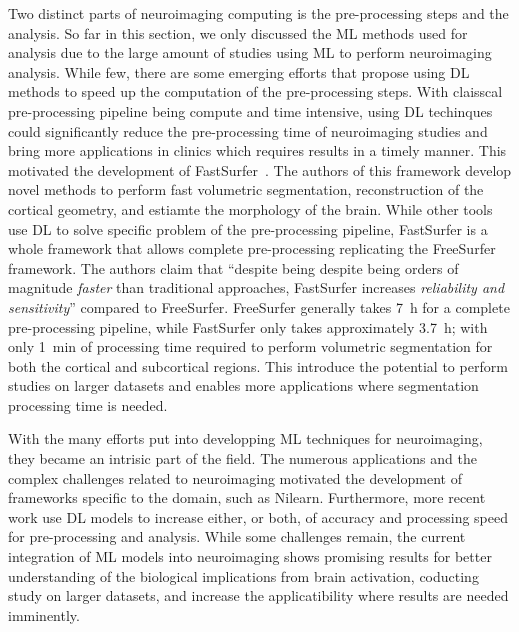 Two distinct parts of neuroimaging computing is the pre-processing steps and the analysis.
So far in this section, we only discussed the ML methods used for analysis due to
the large amount of studies using ML to perform neuroimaging analysis.
While few, there are some emerging efforts that propose using DL methods to speed up
the computation of the pre-processing steps.
With claisscal pre-processing pipeline being compute and time intensive, using 
DL techinques could significantly reduce the pre-processing time of neuroimaging studies
and bring more applications in clinics which requires results in a timely manner.
This motivated the development of FastSurfer~\cite{Henschel2020-vq}.
The authors of this framework develop novel methods to perform fast volumetric segmentation,
reconstruction of the cortical geometry, and estiamte the morphology of the brain.
While other tools use DL to solve specific problem of the pre-processing pipeline,
FastSurfer is a whole framework that allows complete pre-processing replicating the 
FreeSurfer framework.
The authors claim that ``despite being despite being orders of magnitude \textit{faster} than
traditional approaches, FastSurfer increases \textit{reliability and sensitivity}'' compared to FreeSurfer.
FreeSurfer generally takes \SI{7}{\hour} for a complete pre-processing pipeline, while
FastSurfer only takes approximately \SI{3.7}{\hour}; with only \SI{1}{\minute} of
processing time required to perform volumetric segmentation for both the cortical and subcortical regions.
This introduce the potential to perform studies on larger datasets and enables more
applications where segmentation processing time is needed.

With the many efforts put into developping ML techniques for neuroimaging, they 
became an intrisic part of the field.
The numerous applications and the complex challenges related to neuroimaging 
motivated the development of frameworks specific to the domain, such as Nilearn.
Furthermore, more recent work use DL models to increase either, or both, of accuracy
and processing speed for pre-processing and analysis.
While some challenges remain, the current integration of ML models into neuroimaging
shows promising results for better understanding of the biological implications from 
brain activation, coducting study on larger datasets, and increase the 
applicatibility where results are needed imminently.


